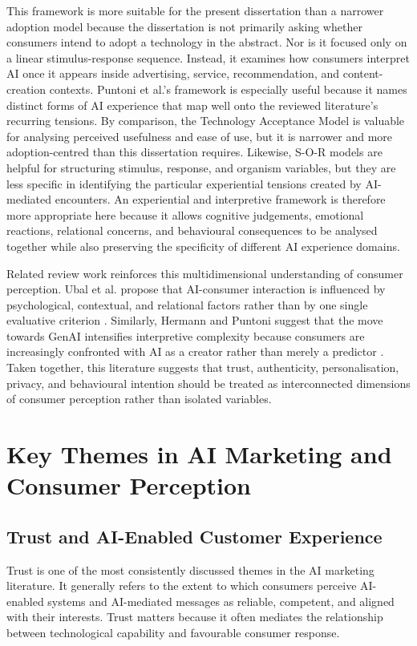 This framework is more suitable for the present dissertation than a narrower adoption model because the dissertation is not primarily asking whether consumers intend to adopt a technology in the abstract. Nor is it focused only on a linear stimulus-response sequence. Instead, it examines how consumers interpret AI once it appears inside advertising, service, recommendation, and content-creation contexts. Puntoni et al.'s framework is especially useful because it names distinct forms of AI experience that map well onto the reviewed literature's recurring tensions. By comparison, the Technology Acceptance Model is valuable for analysing perceived usefulness and ease of use, but it is narrower and more adoption-centred than this dissertation requires. Likewise, S-O-R models are helpful for structuring stimulus, response, and organism variables, but they are less specific in identifying the particular experiential tensions created by AI-mediated encounters. An experiential and interpretive framework is therefore more appropriate here because it allows cognitive judgements, emotional reactions, relational concerns, and behavioural consequences to be analysed together while also preserving the specificity of different AI experience domains.

Related review work reinforces this multidimensional understanding of consumer perception. Ubal et al. propose that AI-consumer interaction is influenced by psychological, contextual, and relational factors rather than by one single evaluative criterion \cite{ubal2024framework}. Similarly, Hermann and Puntoni suggest that the move towards GenAI intensifies interpretive complexity because consumers are increasingly confronted with AI as a creator rather than merely a predictor \cite{hermann2024consumer}. Taken together, this literature suggests that trust, authenticity, personalisation, privacy, and behavioural intention should be treated as interconnected dimensions of consumer perception rather than isolated variables.

\section{Key Themes in AI Marketing and Consumer Perception}

\subsection{Trust and AI-Enabled Customer Experience}
Trust is one of the most consistently discussed themes in the AI marketing literature. It generally refers to the extent to which consumers perceive AI-enabled systems and AI-mediated messages as reliable, competent, and aligned with their interests. Trust matters because it often mediates the relationship between technological capability and favourable consumer response.

